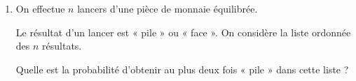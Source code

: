 \begin{enumerate}
	\medskip
	
	\item On effectue $n$ lancers d’une pièce de monnaie équilibrée.
	
	Le résultat d’un lancer est « pile » ou « face ». On considère la liste ordonnée des $n$ résultats.
	
	Quelle est la probabilité d’obtenir au plus deux fois « pile » dans cette liste ?
	
	\medskip
	
\end{enumerate}